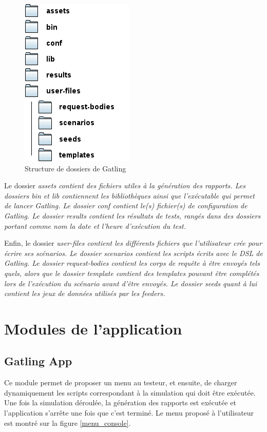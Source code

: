 \begin{figure}[h]
\begin{center}
\includegraphics{img/folders.png}
\end{center}
\caption{Structure de dossiers de Gatling}
\label{folders}
\end{figure}

Le dossier \em{assets} contient des fichiers utiles à la génération des rapports. Les dossiers \em{bin} et \em{lib} contiennent les bibliothèques ainsi que l'exécutable qui permet de lancer Gatling. Le dossier \em{conf} contient le(s) fichier(s) de configuration de Gatling. Le dossier \em{results} contient les résultats de tests, rangés dans des dossiers portant comme nom la date et l'heure d'exécution du test.

Enfin, le dossier \em{user-files} contient les différents fichiers que l'utilisateur crée pour écrire ses scénarios. Le dossier \em{scenarios} contient les scripts écrits avec le DSL de Gatling. Le dossier \em{request-bodies} contient les corps de requête à être envoyés tels quels, alors que le dossier \em{template} contient des templates pouvant être complétés lors de l'exécution du scénario avant d'être envoyés. Le dossier \em{seeds} quant à lui contient les jeux de données utilisés par les feeders.

\section{Modules de l'application}
\subsection{Gatling App}
Ce module permet de proposer un menu au testeur, et ensuite, de charger dynamiquement les scripts correspondant à la simulation qui doit être exécutée. Une fois la simulation déroulée, la génération des rapports est exécutée et l'application s'arrête une fois que c'est terminé. Le menu proposé à l'utilisateur est montré sur la figure \ref{menu_console}.

